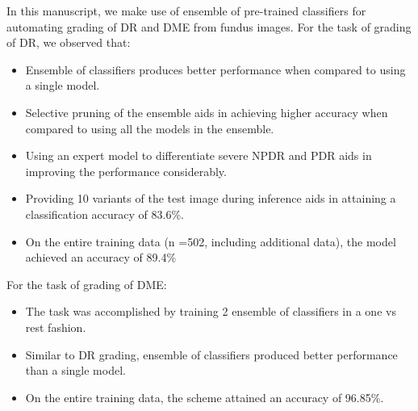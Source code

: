 \documentclass{paper}
\begin{document}
In this manuscript, we make use of ensemble of pre-trained classifiers for automating grading of DR and DME from fundus images. For the task of grading of DR, we observed that:
\begin{itemize}
\item Ensemble of classifiers produces better performance when compared to using a single model.
\item Selective pruning of the ensemble aids in achieving higher accuracy when compared to using all the models in the ensemble.
\item Using an expert model to differentiate severe NPDR and PDR aids in improving the performance considerably.
\item Providing 10 variants of the test image during inference aids in attaining a classification accuracy of 83.6\%.
\item On the entire training data (n =502, including additional data), the model achieved an accuracy of 89.4\%
\end{itemize}
For the task of grading of DME:
\begin{itemize}
\item The task was accomplished by training 2 ensemble of classifiers in a one vs rest fashion.
\item Similar to DR grading, ensemble of classifiers produced better performance than a single model.
\item On the entire training data, the scheme attained an accuracy of 96.85\%.
\end{itemize}








 
























	
\end{document}
